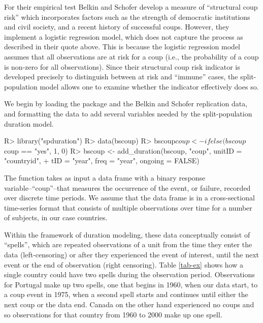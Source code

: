 \documentclass[article]{jss}
\begin{document}
For their empirical test Belkin and Schofer develop a measure of
``structural coup risk'' which incorporates factors such as the strength
of democratic institutions and civil society, and a recent history of
successful coups. However, they implement a logistic regression model,
which does not capture the process as described in their quote above.
This is because the logistic regression model assumes that all
observations are at risk for a coup (i.e., the probability of a coup is
non-zero for all observations). Since their structural coup risk
indicator is developed precisely to distinguish between at risk and
``immune'' cases, the split-population model allows one to examine
whether the indicator effectively does so.

We begin by loading the package and the Belkin and Schofer replication
data, and formatting the data to add several variables needed by the
split-population duration model.

\begin{CodeChunk}
\begin{CodeInput}
R> library("spduration")
R> data(bscoup)
R> bscoup$coup <- ifelse(bscoup$coup == "yes", 1, 0)
R> bscoup <- add_duration(bscoup, "coup", unitID = "countryid", 
+    tID = "year", freq = "year", ongoing = FALSE)
\end{CodeInput}
\end{CodeChunk}

The  function takes as input a data frame with a
binary response variable--``coup''--that measures the occurrence of the
event, or failure, recorded over discrete time periods. We assume that
the data frame is in a cross-sectional time-series format that consists
of multiple observations over time for a number of subjects, in our case
countries.

Within the framework of duration modeling, these data conceptually
consist of ``spells'', which are repeated observations of a unit from
the time they enter the data (left-censoring) or after they experienced
the event of interest, until the next event or the end of observation
(right censoring). Table \ref{tab-ex} shows how a single country could
have two spells during the observation period. Observations for Portugal
make up two spells, one that begins in 1960, when our data start, to a
coup event in 1975, when a second spell starts and continues until
either the next coup or the data end. Canada on the other hand
experienced no coups and so observations for that country from 1960 to
2000 make up one spell.
\end{document}
